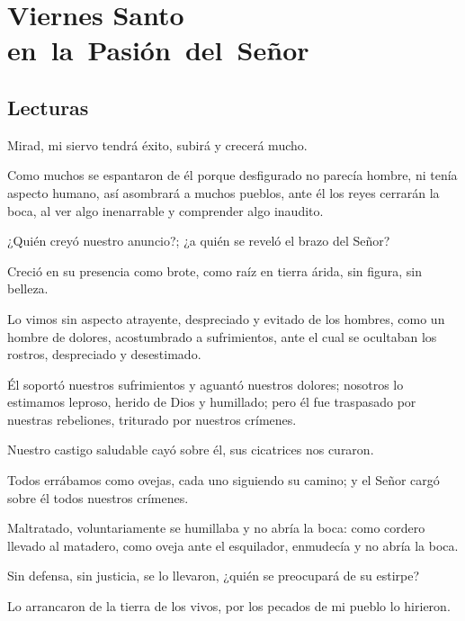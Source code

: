 
\chapter{Viernes Santo en~la~Pasión~del~Señor}

\section{Lecturas}


 


\begin{readprose}
Mirad, mi siervo tendrá éxito, 
   subirá y crecerá mucho. 

Como muchos se espantaron de él 
   porque desfigurado no parecía hombre, 
   ni tenía aspecto humano, 
   así asombrará a muchos pueblos, 
   ante él los reyes cerrarán la boca, 
   al ver algo inenarrable 
   y comprender algo inaudito.
   
¿Quién creyó nuestro anuncio?; 
   ¿a quién se reveló el brazo del Señor? 

Creció en su presencia como brote, 
   como raíz en tierra árida, 
   sin figura, sin belleza. 
   
Lo vimos sin aspecto atrayente, 
   despreciado y evitado de los hombres, 
   como un hombre de dolores, 
   acostumbrado a sufrimientos, 
   ante el cual se ocultaban los rostros, 
   despreciado y desestimado. 

\newpage    
Él soportó nuestros sufrimientos 
   y aguantó nuestros dolores; 
   nosotros lo estimamos leproso, 
   herido de Dios y humillado; 
   pero él fue traspasado por nuestras rebeliones, 
   triturado por nuestros crímenes. 
   
Nuestro castigo saludable cayó sobre él, 
   sus cicatrices nos curaron. 
   
Todos errábamos como ovejas, 
   cada uno siguiendo su camino; 
   y el Señor cargó sobre él 
   todos nuestros crímenes. 
   
Maltratado, voluntariamente se humillaba 
   y no abría la boca: 
   como cordero llevado al matadero, 
   como oveja ante el esquilador, 
   enmudecía y no abría la boca. 

Sin defensa, sin justicia, se lo llevaron, 
   ¿quién se preocupará de su estirpe? 
   
Lo arrancaron de la tierra de los vivos,
   por los pecados de mi pueblo lo hirieron. 
   

\end{readprose}
